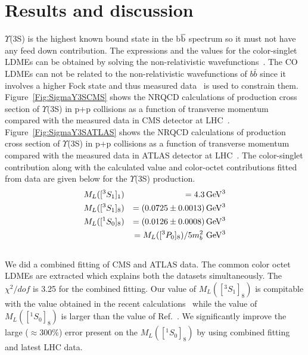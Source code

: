 \documentclass[twocolumn,amsmath,amssymb]{snp}
\begin{document}
\section*{Results and discussion}
$\Upsilon$(3S) is the highest known bound state in the b$\overline{\rm b}$ spectrum 
so it must not have any feed down contribution. 
The expressions and the values for the 
color-singlet LDMEs can be obtained by solving the non-relativistic 
wavefunctions~\cite{Cho:1995vh}. 
The CO LDMEs can not be related to the non-relativistic
wavefunctions of $b \bar b$ since it involves a higher Fock state and thus
measured data~\cite{Khachatryan:2015qpa,Aad:2012dlq} is used to constrain them.
Figure~\ref{Fig:SigmaY3SCMS} shows the NRQCD calculations of production cross section of 
$\Upsilon$(3S) in p+p collisions as a function of transverse momentum compared with the 
measured data in CMS detector at LHC~\cite{Khachatryan:2015qpa}. 
Figure~\ref{Fig:SigmaY3SATLAS} shows the NRQCD calculations of production cross section of 
$\Upsilon$(3S) in p+p collisions as a function of transverse momentum compared with the 
measured data in ATLAS detector at LHC~\cite{Aad:2012dlq}.
The color-singlet contribution along with the calculated value 
and color-octet contributions fitted from data are given below for the 
$\Upsilon$(3S) production.
\begin{eqnarray}
  &M_{L}([^3S_1]_{1}) &= 4.3 \,{\rm GeV^3}\nonumber \\
  &M_{L}([^3S_1]_{8}) &= (0.0725\pm0.0013) \, {\rm GeV^3}\nonumber \\
  &M_{L}([^1S_0]_{8}) &= (0.0126\pm0.0008) \,{\rm GeV^3} \nonumber \\ \nonumber
  &&=  M_{L}([^3P_0]_{8})/5m_{b}^{2}\,\,{\rm GeV^3} \nonumber \\ \nonumber
\end{eqnarray}
We did a combined fitting of CMS and ATLAS data. The common color octet LDMEs are extracted which 
explains both the datasets simultaneously. The $\chi^2/dof$ is 3.25 for the combined fitting.
Our value of $M_{L}([^3S_1]_{8})$ is compitable with the value obtained in the recent 
calculations~\cite{Sharma:2012dy} while the value of $M_{L}([^1S_0]_{8})$ is larger than
the value of Ref.~\cite{Sharma:2012dy}. We significantly improve the large ($\approx 300\%$) error 
present on the $M_{L}([^1S_0]_{8})$ by using combined fitting and latest LHC data.
\end{document}
